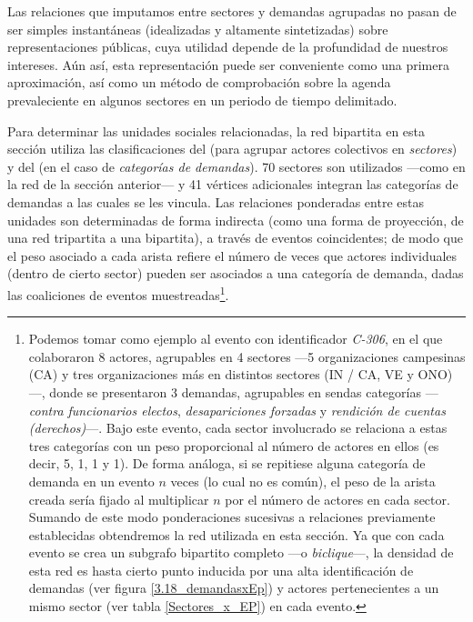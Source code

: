 \documentclass[letterpaper, 11pt]{book}
\theoremstyle{definition}
\theoremstyle{remark}
\begin{document}
Las relaciones que imputamos entre sectores y demandas agrupadas no pasan de ser simples instantáneas (idealizadas y altamente sintetizadas) sobre representaciones públicas, cuya utilidad depende de la profundidad de nuestros intereses. 
Aún así, esta representación puede ser conveniente como una primera aproximación, así como un método de comprobación sobre la agenda prevaleciente en algunos sectores en un periodo de tiempo delimitado. 


Para determinar las unidades sociales relacionadas, la red bipartita en esta sección utiliza las clasificaciones del  (para agrupar actores colectivos en \emph{sectores}) y del  (en el caso de \emph{categorías de demandas}). 
70 sectores son utilizados ---como en la red de la sección anterior--- y 41 vértices adicionales integran las categorías de demandas a las cuales se les vincula. 
Las relaciones ponderadas entre estas unidades son determinadas de forma indirecta (como una forma de proyección, de una red tripartita a una bipartita), a través de eventos coincidentes; de modo que el peso asociado a cada arista refiere el número de veces que actores individuales (dentro de cierto sector) pueden ser asociados a una categoría de demanda, dadas las coaliciones de eventos muestreadas\footnote{
    Podemos tomar como ejemplo al evento con identificador \emph{C-306}, en el que colaboraron 8 actores, agrupables en 4 sectores ---5 organizaciones campesinas (CA) y tres organizaciones más en distintos sectores (IN / CA, VE y ONO)---, donde se presentaron 3 demandas, agrupables en sendas categorías ---\emph{contra funcionarios electos}, \emph{desapariciones forzadas} y \emph{rendición de cuentas (derechos)}---. 
    Bajo este evento, cada sector involucrado se relaciona a estas tres categorías con un peso proporcional al número de actores en ellos (es decir, 5, 1, 1 y 1). 
    De forma análoga, si se repitiese alguna categoría de demanda en un evento $n$ veces (lo cual no es común), el peso de la arista creada sería fijado al multiplicar $n$ por el número de actores en cada sector. 
    Sumando de este modo ponderaciones sucesivas a relaciones previamente establecidas obtendremos la red utilizada en esta sección. 
    Ya que con cada evento se crea un subgrafo bipartito completo ---o \emph{biclique}---, la densidad de esta red es hasta cierto punto inducida por una alta identificación de demandas (ver figura \ref{3.18_demandasxEp}) y actores pertenecientes a un mismo sector (ver tabla \ref{Sectores_x_EP}) en cada evento.
}.
\end{document}
